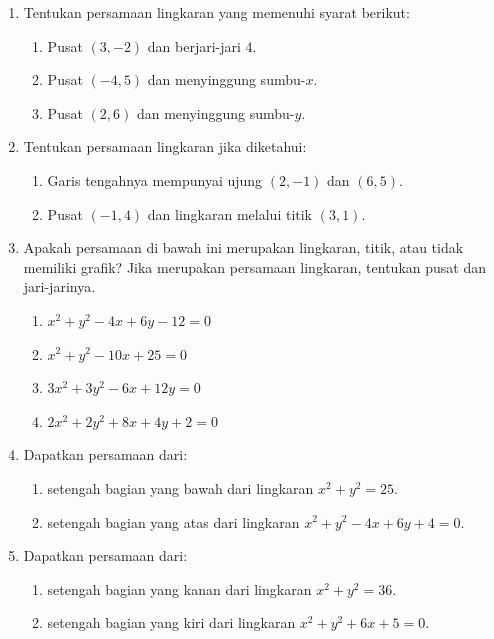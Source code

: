 \documentclass[12pt]{article}
\begin{document}
\begin{enumerate}
    \item Tentukan persamaan lingkaran yang memenuhi syarat berikut:
    \begin{enumerate}
        \item Pusat $(3, -2)$ dan berjari-jari $4$.
        \item Pusat $(-4, 5)$ dan menyinggung sumbu-$x$.
        \item Pusat $(2, 6)$ dan menyinggung sumbu-$y$.
    \end{enumerate}
    
    \item Tentukan persamaan lingkaran jika diketahui:
    \begin{enumerate}
        \item Garis tengahnya mempunyai ujung $(2, -1)$ dan $(6, 5)$.
        \item Pusat $(-1, 4)$ dan lingkaran melalui titik $(3, 1)$.
    \end{enumerate}

    \item Apakah persamaan di bawah ini merupakan lingkaran, titik, atau tidak memiliki grafik? Jika merupakan persamaan lingkaran, tentukan pusat dan jari-jarinya.
    \begin{enumerate}
        \item $x^2 + y^2 - 4x + 6y - 12 = 0$
        \item $x^2 + y^2 - 10x + 25 = 0$
        \item $3x^2 + 3y^2 - 6x + 12y = 0$
        \item $2x^2 + 2y^2 + 8x + 4y + 2 = 0$
    \end{enumerate}

    \item Dapatkan persamaan dari:
    \begin{enumerate}
        \item setengah bagian yang bawah dari lingkaran $x^2 + y^2 = 25$.
        \item setengah bagian yang atas dari lingkaran $x^2 + y^2 - 4x + 6y + 4 = 0$.
    \end{enumerate}

    \item Dapatkan persamaan dari:
    \begin{enumerate}
        \item setengah bagian yang kanan dari lingkaran $x^2 + y^2 = 36$.
        \item setengah bagian yang kiri dari lingkaran $x^2 + y^2 + 6x + 5 = 0$.
    \end{enumerate}


\end{enumerate}
\end{document}
